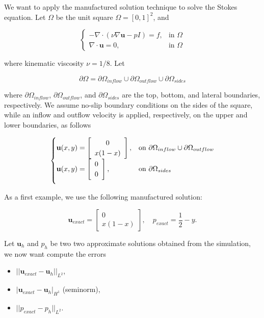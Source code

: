 \documentclass[11pt,a4paper,titlepage]{report}
\begin{document}
We want to apply the manufactured solution technique to solve the Stokes equation. Let $\Omega$ be the unit square $\Omega = [0,1]^2$, and

\vspace{0.2cm}
\[
\begin{cases}
- \nabla \cdot (\nu \nabla \mathbf{u} - pI) = f, & \mbox{in } \Omega \\
\nabla \cdot \mathbf{u} = 0, & \mbox{in } \Omega
\end{cases}
\]
\vspace{0.2cm}

where kinematic viscosity $\nu = 1/8$. Let

\[
\partial \Omega = \partial \Omega_{inflow} \cup \partial \Omega_{outflow} \cup \partial \Omega_{sides}
\]

where $\partial \Omega_{inflow}$, $\partial \Omega_{outflow}$, and $\partial \Omega_{sides}$ are the top, bottom, and lateral boundaries, respectively. We assume no-slip boundary conditions on the sides of the square, while an inflow and outflow velocity is applied, respectively, on the upper and lower boundaries, as follows

\[
\begin{cases}
\mathbf{u}(x,y) = \left[ \begin{array}{c} 0 \\ x(1-x) \end{array} \right] , & \mbox{on } \partial \Omega_{inflow} \cup \partial \Omega_{outflow} \\

\vspace{.2cm}

\mathbf{u}(x,y) = \left[ \begin{array}{c} 0 \\ 0 \end{array} \right], & \mbox{on } \partial \Omega_{sides}
\end{cases}
\]

As a first example, we use the following manufactured solution:

\[
\mathbf{u}_{exact} = \left[ \begin{array}{c} 0 \\ x(1-x) \end{array} \right], \quad
p_{exact} = \frac{1}{2}-y.
\]

Let $\mathbf{u}_h$ and $p_h$ be two two approximate solutions obtained from the simulation, we now want compute the errors

\begin{itemize}
\item $|| \mathbf{u}_{exact} - \mathbf{u}_h ||_{L^2}$,
\item $ | \mathbf{u}_{exact} - \mathbf{u}_h |_{H^1}$ (seminorm),
\item $|| p_{exact} - p_h ||_{L^2} $.
\end{itemize}
\end{document}
